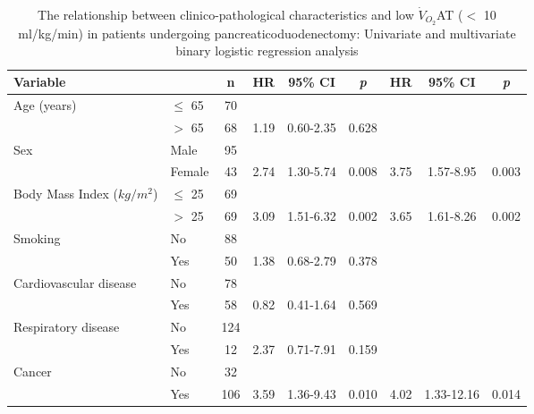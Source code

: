 \begin{sidewaystable}[p]
	\caption{The relationship between clinico-pathological characteristics and low $\dot{V}_{O_2}$AT ($<$ 10 ml/kg/min) in patients undergoing pancreaticoduodenectomy: Univariate and multivariate binary logistic regression analysis}
	\label{table:cpet_oj_at_regression}
	\setlength{\tabcolsep}{9pt} %
	\centering
	\begin{tabular}{|l l c| c c c| c c c|}
		\hline
		Variable                   &           & n   & HR   & 95\% CI    & \textit{p} & HR   & 95\% CI    & \textit{p} \\ \hline
		Age (years)                & $\leq$ 65 & 70  &      &            &            &      &            &  \\
		                           & $>$ 65    & 68  & 1.19 & 0.60-2.35  & 0.628      &      &            &  \\
		Sex                        & Male      & 95  &      &            &            &      &            &  \\
		                           & Female    & 43  & 2.74 & 1.30-5.74  & 0.008      & 3.75 & 1.57-8.95  & 0.003      \\
		Body Mass Index ($kg/m^2$) & $\leq$ 25 & 69  &      &            &            &      &            &  \\
		                           & $>$ 25    & 69  & 3.09 & 1.51-6.32  & 0.002      & 3.65 & 1.61-8.26  & 0.002      \\
		Smoking                    & No        & 88  &      &            &            &      &            &  \\
		                           & Yes       & 50  & 1.38 & 0.68-2.79  & 0.378      &      &            &  \\
		Cardiovascular disease     & No        & 78  &      &            &            &      &            &  \\
		                           & Yes       & 58  & 0.82 & 0.41-1.64  & 0.569      &      &            &  \\
		Respiratory disease        & No        & 124 &      &            &            &      &            &  \\
		                           & Yes       & 12  & 2.37 & 0.71-7.91  & 0.159      &      &            &  \\
		Cancer                     & No        & 32  &      &            &            &      &            &  \\
		                           & Yes       & 106 & 3.59 & 1.36-9.43  & 0.010      & 4.02 & 1.33-12.16 & 0.014      \\

\end{tabular}
\end{sidewaystable}
